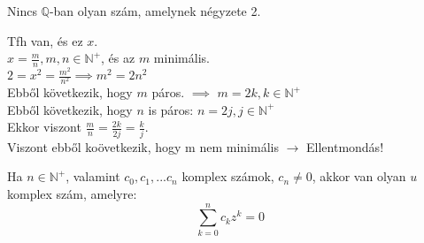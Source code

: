 \begin{frame}

\begin{tcolorbox}[title={Tétel: $\sqrt{2}$ nem racionális}]
Nincs $\mathbb{Q}$-ban olyan szám, amelynek négyzete 2.
\end{tcolorbox}

\begin{tcolorbox}[title={Bizonyítás (Indirekt)}]
Tfh van, és ez $x$.\\
$x = \frac{m}{n}, m,n \in \mathbb{N}^+$, és az $m$ minimális.\\
$2 = x^2 = \frac{m^2}{n^2} \implies m^2 = 2n^2$\\
Ebből következik, hogy $m$ páros. $\implies$ $m = 2k, k \in \mathbb{N}^+$\\
Ebből következik, hogy $n$ is páros: $n = 2j, j \in \mathbb{N}^+$\\
Ekkor viszont $\frac{m}{n} = \frac{2k}{2j} = \frac{k}{j}$.\\
Viszont ebből koövetkezik, hogy m nem minimális $\rightarrow$ Ellentmondás!

\end{tcolorbox}
\end{frame}

\begin{frame}

\begin{tcolorbox}[title={Tétel: Az algebra alaptétele}]
Ha $n \in \mathbb{N}^+$, valamint $c_0, c_1, ... c_n$ komplex számok, $c_n \neq 0$, akkor van olyan $u$ komplex szám, amelyre:\\
$$\sum_{k = 0}^n c_kz^k = 0$$
\end{tcolorbox}

\end{frame}

\begin{frame}[plain]
\end{frame}

